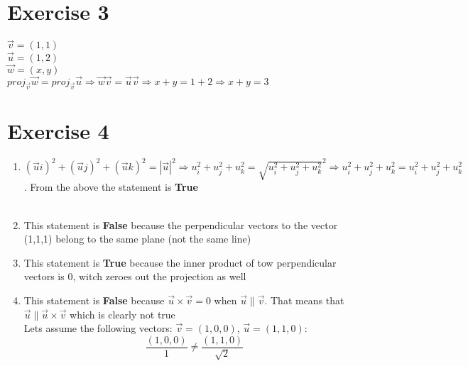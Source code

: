 \documentclass{article}
\begin{document}
\begin{center}
\end{center}

\section*{Exercise 3}
$\vec{v}= (1,1)$\\
$\vec{u}= (1,2)$\\
$\vec{w}= (x,y)$
\\
$proj_{\vec{v}}\vec{w}= proj_{\vec{v}}\vec{u} \Rightarrow
\vec{w}\vec{v}=\vec{u}\vec{v}\Rightarrow
x+y=1+2\Rightarrow
x+y=3
$

\begin{center}
\end{center}

\section*{Exercise 4}
\begin{enumerate}
    \item $(\vec{u} i)^2+(\vec{u}j)^2+(\vec{u}k)^2=|\vec{u}|^2 \Rightarrow
    u_i^2+ u_j^2+u_k^2 = \sqrt{u_i^2+ u_j^2+u_k^2}^2 \Rightarrow
    u_i^2+ u_j^2+u_k^2 = u_i^2+ u_j^2+u_k^2
    $. From the above the statement is \textbf{True}
    \\
    \\
    \item This statement is \textbf{False} because the perpendicular vectors to the vector (1,1,1) belong to the same plane (not the same line)
    \\
    \item This statement is \textbf{True} because the inner product of tow perpendicular vectors is 0, witch zeroes out the projection as well
    \\
    \item This statement is \textbf{False} because $\vec{u} \times \vec{v} = 0$ when $\vec{u} \parallel \vec{v}$. That means that $ \vec{u} \parallel \vec{u} \times \vec{v}$ which is clearly not true
    \\
    Lets assume the following vectors: $\vec{v}=(1,0,0)$, $\vec{u}=(1,1,0)$:
    $$\frac{(1,0,0)}{1} \neq \frac{(1,1,0)}{\sqrt{2}}$$
\end{enumerate}
\end{document}
